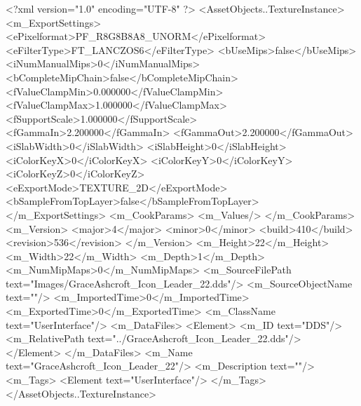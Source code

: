 <?xml version="1.0" encoding="UTF-8" ?>
<AssetObjects..TextureInstance>
	<m_ExportSettings>
		<ePixelformat>PF_R8G8B8A8_UNORM</ePixelformat>
		<eFilterType>FT_LANCZOS6</eFilterType>
		<bUseMips>false</bUseMips>
		<iNumManualMips>0</iNumManualMips>
		<bCompleteMipChain>false</bCompleteMipChain>
		<fValueClampMin>0.000000</fValueClampMin>
		<fValueClampMax>1.000000</fValueClampMax>
		<fSupportScale>1.000000</fSupportScale>
		<fGammaIn>2.200000</fGammaIn>
		<fGammaOut>2.200000</fGammaOut>
		<iSlabWidth>0</iSlabWidth>
		<iSlabHeight>0</iSlabHeight>
		<iColorKeyX>0</iColorKeyX>
		<iColorKeyY>0</iColorKeyY>
		<iColorKeyZ>0</iColorKeyZ>
		<eExportMode>TEXTURE_2D</eExportMode>
		<bSampleFromTopLayer>false</bSampleFromTopLayer>
	</m_ExportSettings>
	<m_CookParams>
		<m_Values/>
	</m_CookParams>
	<m_Version>
		<major>4</major>
		<minor>0</minor>
		<build>410</build>
		<revision>536</revision>
	</m_Version>
	<m_Height>22</m_Height>
	<m_Width>22</m_Width>
	<m_Depth>1</m_Depth>
	<m_NumMipMaps>0</m_NumMipMaps>
	<m_SourceFilePath text="Images/GraceAshcroft_Icon_Leader_22.dds"/>
	<m_SourceObjectName text=""/>
	<m_ImportedTime>0</m_ImportedTime>
	<m_ExportedTime>0</m_ExportedTime>
	<m_ClassName text="UserInterface"/>
	<m_DataFiles>
		<Element>
			<m_ID text="DDS"/>
			<m_RelativePath text="../GraceAshcroft_Icon_Leader_22.dds"/>
		</Element>
	</m_DataFiles>
	<m_Name text="GraceAshcroft_Icon_Leader_22"/>
	<m_Description text=""/>
	<m_Tags>
		<Element text="UserInterface"/>
	</m_Tags>
</AssetObjects..TextureInstance>
